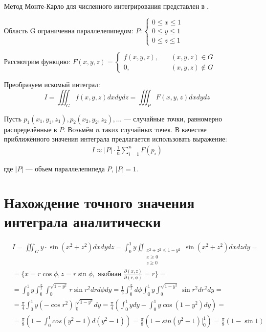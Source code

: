 \documentclass[oneside, final, 12pt]{extarticle}
\begin{document}
Метод Монте-Карло для численного интегрирования представлен в \cite{Bahvalov1987}.

Область G ограниченна параллелепипедом: $ P: \begin{cases}
        0 \leq x \leq 1 \\
        0 \leq y \leq 1 \\
        0 \leq z \leq 1
    \end{cases} $

Рассмотрим функцию: $ F(x, y, z) =  \begin{cases}
        f(x, y, z), & \quad (x, y, z) \in G    \\
        0 ,         & \quad (x, y, z) \notin G
    \end{cases} $

Преобразуем искомый интеграл:
$$
    I = \iiint_{G} f(x, y ,z) dx dy dz = \iiint_{P} F(x, y ,z   ) dx dy dz
$$

Пусть $ p_1(x_1, y_1, z_1), p_2(x_2, y_2, z_2), ... $ --- случайные точки, равномерно распределённые в $ P $.
Возьмём $ n $ таких случайных точек. В качестве приближённого значения интеграла предлагается использовать выражение:
\begin{align}
    I \approx | P | \cdot \frac{1}{n} \sum_{i = 1}^n F(p_i)
\end{align}

где $ | P | $ --- объем параллелепипеда $ P $, $ | P | = 1 $.

\section{Нахождение точного значения интеграла аналитически}

\begin{align*}
     & I = \iiint_{G} y \cdot \sin ( x^2 + z^2 ) dx dy dz = \int_0^1 y \iint_{\substack{ x^2 + z^2 \leq 1 - y^2                                                                                   \\ x \geq 0 \\ z \geq 0 }} \sin ( x^2 + z^2 ) dx dz dy = \\
     & = \{ x = r \cos \phi, z = r \sin \phi, \text{ якобиан } \frac{ \partial (x, z) }{ \partial (r, \phi) } = r \} =                                                                            \\
     & = \int_0^1 y \int_0^{\frac{\pi}{2}} \int_{0}^{\sqrt{1 - y^2}} r \sin r^2 dr d \phi dy = \frac{1}{2} \int_0^{\frac{\pi}{2}} d \phi \int_0^1 y \int_{0}^{\sqrt{1 - y^2}} \sin r^2 d r^2 dy = \\
     & = \frac{\pi}{4} \int_0^1 y (- \cos r^2) |_{0}^{\sqrt{1 - y^2}} dy = \frac{\pi}{4} ( \int_0^1 y dy - \int_0^1 y \cos (1 - y^2 ) dy) =                                                       \\
     & = \frac{\pi}{8} ( 1 - \int_{0}^{1} cos( y^2 - 1) d( y^2 - 1 ) ) = \frac{\pi}{8} ( 1 - sin( y^2 - 1 ) |_{0}^{1} ) = \frac{\pi}{8} (1 - \sin 1)
\end{align*}
\end{document}
